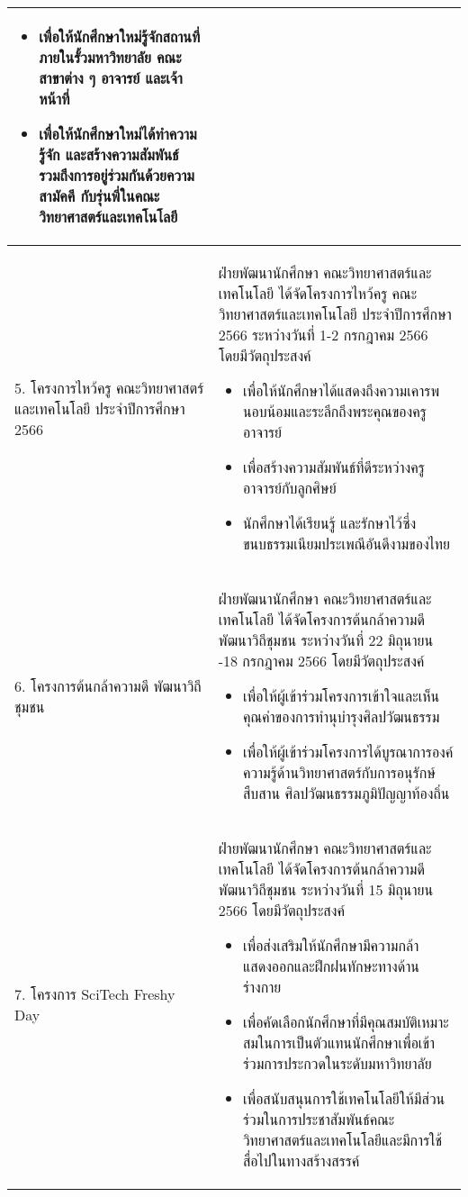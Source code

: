 \begin{longtable}{ |>{\raggedright}p{4.5cm}|p{9cm}|}
\begin{itemize}
\item เพื่อให้นักศึกษาใหม่รู้จักสถานที่ภายในรั้วมหาวิทยาลัย คณะ สาขาต่าง ๆ อาจารย์ และเจ้าหน้าที่
\item เพื่อให้นักศึกษาใหม่ได้ทำความรู้จัก และสร้างความสัมพันธ์ รวมถึงการอยู่ร่วมกันด้วยความสามัคคี กับรุ่นพี่ในคณะวิทยาศาสตร์และเทคโนโลยี
\end{itemize} \\
\hline
5. โครงการไหว้ครู คณะวิทยาศาสตร์และเทคโนโลยี ประจำปีการศึกษา 2566 &  ฝ่ายพัฒนานักศึกษา คณะวิทยาศาสตร์และเทคโนโลยี ได้จัดโครงการไหว้ครู คณะวิทยาศาสตร์และเทคโนโลยี ประจำปีการศึกษา 2566 ระหว่างวันที่ 1-2 กรกฎาคม 2566 โดยมีวัตถุประสงค์
\begin{itemize}
\item เพื่อให้นักศึกษาได้แสดงถึงความเคารพนอบน้อมและระลึกถึงพระคุณของครู อาจารย์ 
\item เพื่อสร้างความสัมพันธ์ที่ดีระหว่างครู อาจารย์กับลูกศิษย์
\item นักศึกษาได้เรียนรู้ และรักษาไว้ซึ่งขนบธรรมเนียมประเพณีอันดีงามของไทย
\end{itemize}
   \\ 
\hline
6. โครงการต้นกล้าความดี พัฒนาวิถีชุมชน  & ฝ่ายพัฒนานักศึกษา คณะวิทยาศาสตร์และเทคโนโลยี ได้จัดโครงการต้นกล้าความดี พัฒนาวิถีชุมชน ระหว่างวันที่ 22 มิถุนายน -18 กรกฎาคม 2566 โดยมีวัตถุประสงค์
\begin{itemize}
 \item เพื่อให้ผู้เข้าร่วมโครงการเข้าใจและเห็นคุณค่าของการทำนุบำรุงศิลปวัฒนธรรม 
\item เพื่อให้ผู้เข้าร่วมโครงการได้บูรณาการองค์ความรู้ด้านวิทยาศาสตร์กับการอนุรักษ์ สืบสาน ศิลปวัฒนธรรมภูมิปัญญาท้องถิ่น 
\end{itemize}
 \\ 
\hline
7. โครงการ SciTech Freshy Day & ฝ่ายพัฒนานักศึกษา คณะวิทยาศาสตร์และเทคโนโลยี ได้จัดโครงการต้นกล้าความดี พัฒนาวิถีชุมชน ระหว่างวันที่ 15 มิถุนายน 2566 โดยมีวัตถุประสงค์
\begin{itemize}
	\item เพื่อส่งเสริมให้นักศึกษามีความกล้าแสดงออกและฝึกฝนทักษะทางด้านร่างกาย
\item เพื่อคัดเลือกนักศึกษาที่มีคุณสมบัติเหมาะสมในการเป็นตัวแทนนักศึกษาเพื่อเข้าร่วมการประกวดในระดับมหาวิทยาลัย
\item เพื่อสนับสนุนการใช้เทคโนโลยีให้มีส่วนร่วมในการประชาสัมพันธ์คณะวิทยาศาสตร์และเทคโนโลยีและมีการใช้สื่อไปในทางสร้างสรรค์
\end{itemize}
   \\ 
\hline
\end{longtable}



